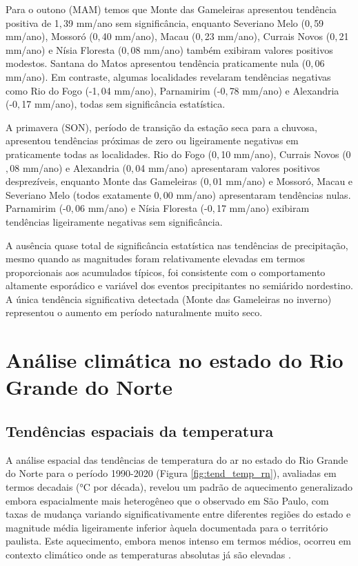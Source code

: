 Para o outono (MAM) temos que Monte das Gameleiras apresentou tendência positiva de 1${,}$39 mm/ano sem significância, enquanto Severiano Melo (0${,}$59 mm/ano), Mossoró (0${,}$40 mm/ano), Macau (0${,}$23 mm/ano), Currais Novos (0${,}$21 mm/ano) e Nísia Floresta (0${,}$08 mm/ano) também exibiram valores positivos modestos. Santana do Matos apresentou tendência praticamente nula (0${,}$06 mm/ano). Em contraste, algumas localidades revelaram tendências negativas como Rio do Fogo (-1${,}$04 mm/ano), Parnamirim (-0${,}$78 mm/ano) e Alexandria (-0${,}$17 mm/ano), todas sem significância estatística.

A primavera (SON), período de transição da estação seca para a chuvosa, apresentou tendências próximas de zero ou ligeiramente negativas em praticamente todas as localidades. Rio do Fogo (0${,}$10 mm/ano), Currais Novos (0${,}$08 mm/ano) e Alexandria (0${,}$04 mm/ano) apresentaram valores positivos desprezíveis, enquanto Monte das Gameleiras (0${,}$01 mm/ano) e Mossoró, Macau e Severiano Melo (todos exatamente 0${,}$00 mm/ano) apresentaram tendências nulas. Parnamirim (-0${,}$06 mm/ano) e Nísia Floresta (-0${,}$17 mm/ano) exibiram tendências ligeiramente negativas sem significância.

A ausência quase total de significância estatística nas tendências de precipitação, mesmo quando as magnitudes foram relativamente elevadas em termos proporcionais aos acumulados típicos, foi consistente com o comportamento altamente esporádico e variável dos eventos precipitantes no semiárido nordestino. A única tendência significativa detectada (Monte das Gameleiras no inverno) representou o aumento em período naturalmente muito seco.

\section{Análise climática no estado do Rio Grande do Norte}
\label{section:analise_rn}

\subsection{Tendências espaciais da temperatura}

A análise espacial das tendências de temperatura do ar no estado do Rio Grande do Norte para o período 1990-2020 (Figura \ref{fig:tend_temp_rn}), avaliadas em termos decadais (°C por década), revelou um padrão de aquecimento generalizado embora espacialmente mais heterogêneo que o observado em São Paulo, com taxas de mudança variando significativamente entre diferentes regiões do estado e magnitude média ligeiramente inferior àquela documentada para o território paulista. Este aquecimento, embora menos intenso em termos médios, ocorreu em contexto climático onde as temperaturas absolutas já são elevadas \citep{santos2014caatinga, marengo2017drought}.

